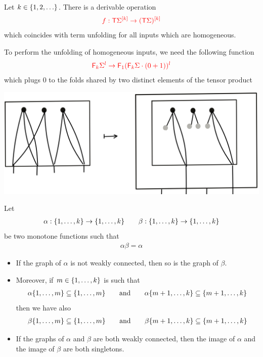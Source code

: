 \begin{lemma}\label{lem:homo-2-twist}
    Let $k \in \set{1,2,\ldots}$. There is a derivable operation 
    \begin{align*}
        \ranked{f : \tmonad \mati k \rSigma \to \mati k {(\tmonad \Sigma)} }
        \end{align*}      
which coincides with term unfolding for all inputs which are homogeneous.
\end{lemma}
To perform the unfolding of homogeneous inputs, we need the following function
\begin{align*}
\ranked{\reduce k \Sigma^l \to \reduce 1 (\reduce k \Sigma\cdot(0+1))^l }
\end{align*}
which plugs $0$ to the folds shared by two distinct elements of the tensor product
\begin{center}
\includegraphics[scale=.07]{MyPic34.jpg}
\end{center}

\begin{lemma}
Let
\begin{align*}
\alpha:\set{1,\dots,k}\to\set{1,\dots,k}\qquad
\beta:\set{1,\dots,k}\to\set{1,\dots,k}
\end{align*} 
be two monotone functions such that
\begin{align*}
\alpha\beta=\alpha
\end{align*}
\begin{itemize}
\item If the graph of $\alpha$ is not weakly connected, then so is the graph of $\beta$. 
\item Moreover, if $m\in \set{1,\dots, k}$ is such that 
\begin{align*}
\alpha\set{1,\dots,m}\subseteq \set{1,\dots,m} \qquad \text{and}\qquad 
\alpha\set{m+1,\dots,k}\subseteq \set{m+1,\dots,k}
\end{align*}
then we have also 
\begin{align*}
\beta\set{1,\dots,m}\subseteq \set{1,\dots,m} \qquad \text{and}\qquad 
\beta\set{m+1,\dots,k}\subseteq \set{m+1,\dots,k}
\end{align*}
\item If the graphs of $\alpha$ and $\beta$ are both weakly connected, then the image of $\alpha$ and the image of $\beta$ are both singletons.
\end{itemize}
\end{lemma}

